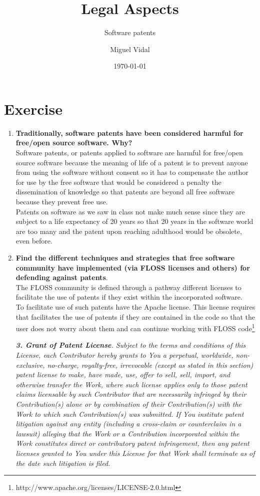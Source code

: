 \documentclass[11pt]{scrartcl}
\title{\textbf{Legal Aspects}}
\subtitle{Software patents}
\author{Miguel Vidal}
\date{\today}
\begin{document}
\maketitle

\section{Exercise}

\begin{enumerate}
	\item \textbf{Traditionally, software patents have been considered harmful for free/open source software. Why?}\\

	Software patents, or patents applied to software are harmful for free/open source software because the meaning of life of a patent is to prevent anyone from using the software without consent so it has to compensate the author for use by the free software that would be considered a penalty the dissemination of knowledge so that patents are beyond all free software because they prevent free use.\\

	Patents on software as we saw in class not make much sense since they are subject to a life expectancy of 20 years so that 20 years in the software world are too many and the patent upon reaching adulthood would be obsolete, even before.

	\item \textbf{Find the different techniques and strategies that free software community have implemented (via FLOSS licenses and others) for defending against patents}.\\

	The FLOSS community is defined through a pathway different licenses to facilitate the use of patents if they exist within the incorporated software.\\

	To facilitate use of such patents have the Apache license. This license requires that facilitates the use of patents if they are contained in the code so that the user does not worry about them and can continue working with FLOSS code\footnote{http://www.apache.org/licenses/LICENSE-2.0.html}
	
	\emph{\textbf{3. Grant of Patent License}. Subject to the terms and conditions of this License, each Contributor hereby grants to You a perpetual, worldwide, non-exclusive, no-charge, royalty-free, irrevocable (except as stated in this section) patent license to make, have made, use, offer to sell, sell, import, and otherwise transfer the Work, where such license applies only to those patent claims licensable by such Contributor that are necessarily infringed by their Contribution(s) alone or by combination of their Contribution(s) with the Work to which such Contribution(s) was submitted. If You institute patent litigation against any entity (including a cross-claim or counterclaim in a lawsuit) alleging that the Work or a Contribution incorporated within the Work constitutes direct or contributory patent infringement, then any patent licenses granted to You under this License for that Work shall terminate as of the date such litigation is filed.}
	
\end{enumerate}
 
\end{document}
